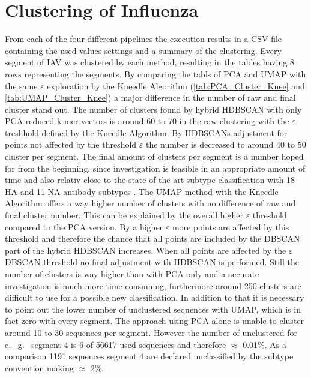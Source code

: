 \section{Clustering of Influenza} \label{sec:Clustering}

From each of the four different pipelines the execution results in a CSV file containing the used values settings and a summary of the clustering. Every segment of \gls{IAV} was clustered by each method, resulting in the tables having 8 rows representing the segments. By comparing the tabls of \gls{PCA} and \gls{UMAP} with the same $\varepsilon$ exploration by the Kneedle Algorithm (\autoref{tab:PCA_Cluster_Knee} and \autoref{tab:UMAP_Cluster_Knee}) a major difference in the number of raw and final cluster stand out. The number of clusters found by hybrid \gls{HDBSCAN} with only \gls{PCA} reduced k-mer vectors is around 60 to 70 in the raw clustering with the $\varepsilon$ treshhold defined by the Kneedle Algorithm. By \glspl{HDBSCAN} adjustment for points not affected by the threshold $\varepsilon$ the number is decreased to around 40 to 50 cluster per segment. The final amount of clusters per segment is a number hoped for from the beginning, since investigation is feasible in an appropriate amount of time and also relativ close to the state of the art subtype classification with 18 \gls{HA} and 11 \gls{NA} antibody subtypes \autocite{noauthor_revision_1980}. The \gls{UMAP} method with the Kneedle Algorithm offers a way higher number of clusters with no difference of raw and final cluster number. This can be explained by the overall higher $\varepsilon$ threshold compared to the \gls{PCA} version. By a higher $\varepsilon$ more points are affected by this threshold and therefore the chance that all points are included by the \gls{DBSCAN} part of the hybrid \gls{HDBSCAN} increases. When all points are affected by the $\varepsilon$ \gls{DBSCAN} threshold no final adjustment with \gls{HDBSCAN} is performed. Still the number of clusters is way higher than with \gls{PCA} only and a accurate investigation is much more time-consuming, furthermore around 250 clusters are difficult to use for a possible new classification. In addition to that it is necessary to point out the lower number of unclustered sequences with \gls{UMAP}, which is in fact zero with every segment. The approach using \gls{PCA} alone is unable to cluster around 10 to 30 sequences per segment. However the number of unclustered for e.~ g.~ segment 4 is 6 of 56617 used sequences and therefore $\approx$ 0.01\%. As a comparison 1191 sequences segment 4 are declared unclassified by the subtype convention making $\approx$ 2\%. 

